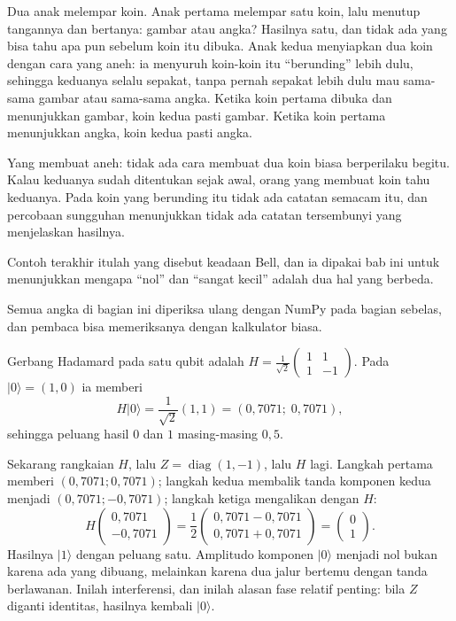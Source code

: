 \begin{untukanak}
Dua anak melempar koin. Anak pertama melempar satu koin, lalu menutup tangannya dan
bertanya: gambar atau angka? Hasilnya satu, dan tidak ada yang bisa tahu apa pun
sebelum koin itu dibuka. Anak kedua menyiapkan dua koin dengan cara yang aneh: ia
menyuruh koin-koin itu ``berunding'' lebih dulu, sehingga keduanya selalu sepakat, tanpa
pernah sepakat lebih dulu mau sama-sama gambar atau sama-sama angka. Ketika koin pertama
dibuka dan menunjukkan gambar, koin kedua pasti gambar. Ketika koin pertama menunjukkan
angka, koin kedua pasti angka.

Yang membuat aneh: tidak ada cara membuat dua koin biasa berperilaku begitu. Kalau
keduanya sudah ditentukan sejak awal, orang yang membuat koin tahu keduanya. Pada koin
yang berunding itu tidak ada catatan semacam itu, dan percobaan sungguhan menunjukkan
tidak ada catatan tersembunyi yang menjelaskan hasilnya.

Contoh terakhir itulah yang disebut keadaan Bell, dan ia dipakai bab ini untuk
menunjukkan mengapa ``nol'' dan ``sangat kecil'' adalah dua hal yang berbeda.
\end{untukanak}

Semua angka di bagian ini diperiksa ulang dengan NumPy pada bagian sebelas, dan pembaca
bisa memeriksanya dengan kalkulator biasa.

Gerbang Hadamard pada satu qubit adalah
$H=\frac{1}{\sqrt{2}}\begin{pmatrix}1&1\\1&-1\end{pmatrix}$. Pada $|0\rangle=(1,0)$ ia
memberi
\[
H|0\rangle=\frac{1}{\sqrt{2}}(1,1)=(0{,}7071;\;0{,}7071),
\]
sehingga peluang hasil $0$ dan $1$ masing-masing $0{,}5$.

Sekarang rangkaian $H$, lalu $Z=\operatorname{diag}(1,-1)$, lalu $H$ lagi. Langkah
pertama memberi $(0{,}7071;0{,}7071)$; langkah kedua membalik tanda komponen kedua
menjadi $(0{,}7071;-0{,}7071)$; langkah ketiga mengalikan dengan $H$:
\[
H\begin{pmatrix}0{,}7071\\-0{,}7071\end{pmatrix}
=\frac{1}{2}\begin{pmatrix}0{,}7071-0{,}7071\\0{,}7071+0{,}7071\end{pmatrix}
=\begin{pmatrix}0\\1\end{pmatrix}.
\]
Hasilnya $|1\rangle$ dengan peluang satu. Amplitudo komponen $|0\rangle$ menjadi nol
bukan karena ada yang dibuang, melainkan karena dua jalur bertemu dengan tanda
berlawanan. Inilah interferensi, dan inilah alasan fase relatif penting: bila $Z$
diganti identitas, hasilnya kembali $|0\rangle$.

